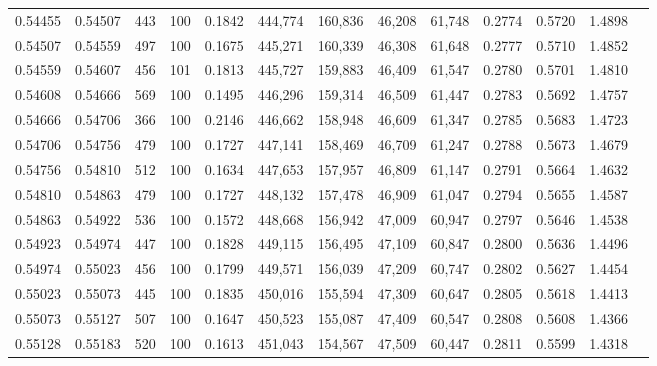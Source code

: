 \begin{tabular}{rrrrrrrrrrrrr}
0.54455 & 0.54507 &   443 & 100 &                                     0.1842 & 444,774 & 160,836 &  46,208 &  61,748 & 0.2774 & 0.5720 & 1.4898 \\
0.54507 & 0.54559 &   497 & 100 &                                     0.1675 & 445,271 & 160,339 &  46,308 &  61,648 & 0.2777 & 0.5710 & 1.4852 \\
0.54559 & 0.54607 &   456 & 101 &                                     0.1813 & 445,727 & 159,883 &  46,409 &  61,547 & 0.2780 & 0.5701 & 1.4810 \\
0.54608 & 0.54666 &   569 & 100 &                                     0.1495 & 446,296 & 159,314 &  46,509 &  61,447 & 0.2783 & 0.5692 & 1.4757 \\
0.54666 & 0.54706 &   366 & 100 &                                     0.2146 & 446,662 & 158,948 &  46,609 &  61,347 & 0.2785 & 0.5683 & 1.4723 \\
0.54706 & 0.54756 &   479 & 100 &                                     0.1727 & 447,141 & 158,469 &  46,709 &  61,247 & 0.2788 & 0.5673 & 1.4679 \\
0.54756 & 0.54810 &   512 & 100 &                                     0.1634 & 447,653 & 157,957 &  46,809 &  61,147 & 0.2791 & 0.5664 & 1.4632 \\
0.54810 & 0.54863 &   479 & 100 &                                     0.1727 & 448,132 & 157,478 &  46,909 &  61,047 & 0.2794 & 0.5655 & 1.4587 \\
0.54863 & 0.54922 &   536 & 100 &                                     0.1572 & 448,668 & 156,942 &  47,009 &  60,947 & 0.2797 & 0.5646 & 1.4538 \\
0.54923 & 0.54974 &   447 & 100 &                                     0.1828 & 449,115 & 156,495 &  47,109 &  60,847 & 0.2800 & 0.5636 & 1.4496 \\
0.54974 & 0.55023 &   456 & 100 &                                     0.1799 & 449,571 & 156,039 &  47,209 &  60,747 & 0.2802 & 0.5627 & 1.4454 \\
0.55023 & 0.55073 &   445 & 100 &                                     0.1835 & 450,016 & 155,594 &  47,309 &  60,647 & 0.2805 & 0.5618 & 1.4413 \\
0.55073 & 0.55127 &   507 & 100 &                                     0.1647 & 450,523 & 155,087 &  47,409 &  60,547 & 0.2808 & 0.5608 & 1.4366 \\
0.55128 & 0.55183 &   520 & 100 &                                     0.1613 & 451,043 & 154,567 &  47,509 &  60,447 & 0.2811 & 0.5599 & 1.4318 \\

\end{tabular}
